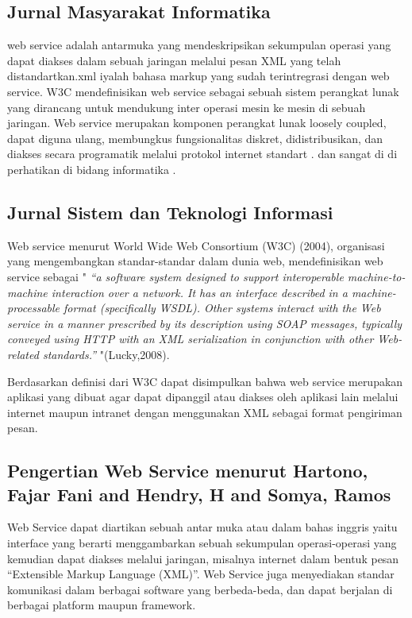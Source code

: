 \documentclass[12pt]{journal}
\begin{document}
\subsection{Jurnal Masyarakat Informatika}

web service adalah antarmuka yang mendeskripsikan sekumpulan operasi yang dapat diakses dalam sebuah jaringan melalui pesan XML yang telah distandartkan.xml iyalah bahasa markup yang sudah terintregrasi dengan web service. W3C mendefinisikan web service sebagai sebuah sistem perangkat lunak yang dirancang untuk mendukung inter operasi mesin ke mesin di sebuah jaringan.  Web service merupakan komponen perangkat lunak loosely coupled, dapat diguna ulang, membungkus fungsionalitas diskret, didistribusikan, dan diakses secara programatik melalui protokol internet standart . dan sangat di di perhatikan di bidang informatika \cite{saputra2integrasi}.

\subsection{Jurnal Sistem dan Teknologi Informasi}

Web service menurut World Wide Web Consortium (W3C) (2004), organisasi yang mengembangkan standar-standar dalam dunia web, mendefinisikan web service sebagai "
\textit{“a software system designed to support interoperable machine-to-machine interaction over a network. It has an interface described in a machine-processable format (specifically WSDL). Other systems interact with the Web service in a manner prescribed by its description using SOAP messages, typically conveyed using HTTP with an XML serialization in conjunction with other Web-related standards.” }"(Lucky,2008).

Berdasarkan definisi dari W3C dapat disimpulkan bahwa web service merupakan aplikasi yang dibuat agar dapat dipanggil atau diakses oleh aplikasi lain melalui internet maupun intranet dengan menggunakan XML sebagai format pengiriman pesan\cite{prasetya2013perancangan}.

\subsection{Pengertian Web Service menurut Hartono, Fajar Fani and Hendry, H and Somya, Ramos}

Web Service dapat diartikan sebuah antar muka atau dalam bahas inggris yaitu interface  yang berarti menggambarkan sebuah sekumpulan operasi-operasi yang kemudian dapat diakses melalui jaringan, misalnya internet dalam bentuk pesan “Extensible Markup Language (XML)”. Web Service juga menyediakan standar komunikasi dalam berbagai software yang berbeda-beda, dan dapat berjalan di berbagai platform maupun framework\cite{hartono2013aplikasi}.
\end{document}

